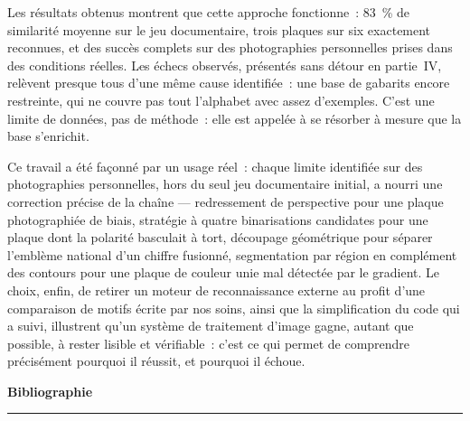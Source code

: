 \documentclass[11pt,a4paper]{article}
\newcommand{\titrecentre}[1]{%
  \begingroup
  \centering\normalfont\huge\bfseries\sffamily#1\par
  \endgroup
  \begin{center}\vspace{4pt}\rule{4cm}{0.8pt}\end{center}
  \vspace{16pt}
}
\begin{document}
Les résultats obtenus montrent que cette approche fonctionne~: 83~\% de similarité moyenne sur le jeu documentaire, trois plaques sur six exactement reconnues, et des succès complets sur des photographies personnelles prises dans des conditions réelles. Les échecs observés, présentés sans détour en partie~IV, relèvent presque tous d'une même cause identifiée~: une base de gabarits encore restreinte, qui ne couvre pas tout l'alphabet avec assez d'exemples. C'est une limite de données, pas de méthode~: elle est appelée à se résorber à mesure que la base s'enrichit.

Ce travail a été façonné par un usage réel~: chaque limite identifiée sur des photographies personnelles, hors du seul jeu documentaire initial, a nourri une correction précise de la chaîne --- redressement de perspective pour une plaque photographiée de biais, stratégie à quatre binarisations candidates pour une plaque dont la polarité basculait à tort, découpage géométrique pour séparer l'emblème national d'un chiffre fusionné, segmentation par région en complément des contours pour une plaque de couleur unie mal détectée par le gradient. Le choix, enfin, de retirer un moteur de reconnaissance externe au profit d'une comparaison de motifs écrite par nos soins, ainsi que la simplification du code qui a suivi, illustrent qu'un système de traitement d'image gagne, autant que possible, à rester lisible et vérifiable~: c'est ce qui permet de comprendre précisément pourquoi il réussit, et pourquoi il échoue.

\clearpage
\titrecentre{Bibliographie}
\label{pg:biblio}
\end{document}
